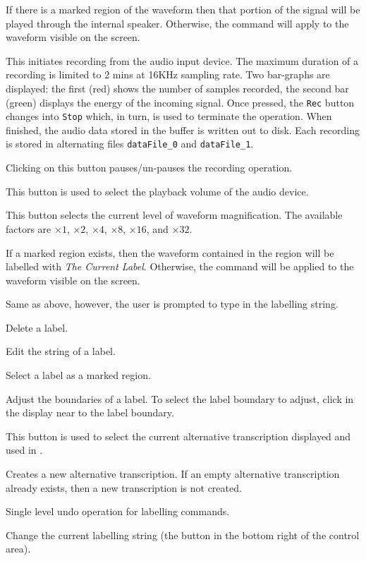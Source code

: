 \begin{optlist}
   If there is a marked region of the waveform then
      that portion of the signal will be played through the internal speaker.
      Otherwise, the command will apply to the waveform visible on the 
      screen.

   This initiates recording from the audio input device. The maximum
      duration of a recording is limited to 2 mins at 16KHz sampling rate. Two bar-graphs 
      are displayed: the first (red) shows the number of samples recorded, the second
      bar (green) displays the energy of the incoming signal. Once pressed, the
      \texttt{Rec} button changes into \texttt{Stop} which, in turn, is used to terminate
      the operation. When finished, the audio data stored in the buffer is written
      out to disk. Each recording is stored in alternating files 
      \texttt{dataFile\_0} and \texttt{dataFile\_1}.

   Clicking on this button pauses/un-pauses the recording operation.

   This button is used to select the playback volume of the
      audio device.

   This button selects the current level of waveform magnification.
      The available factors are $\times 1$,  $\times 2$,  $\times 4$,  $\times 8$, 
       $\times 16$, and  $\times 32$.

   If a marked region exists, then the waveform contained in the 
      region will be labelled with {\em The Current Label}. Otherwise, the 
      command will be applied to the waveform visible on the screen.

   Same as above, however, the user is prompted to type in 
      the labelling string.

   Delete a label.

   Edit the string of a label.

   Select a label as a marked region.

   Adjust the boundaries of a label.  To select the label 
      boundary to adjust, click in the display near to the label boundary.

   This button is used to select the current alternative 
      transcription displayed and used in .

   Creates a new alternative transcription. If an empty alternative 
      transcription already exists, then a new transcription is not created.

   Single level undo operation for labelling commands.

   Change the current labelling string (the button in the 
  bottom right of the control area).
\end{optlist}


